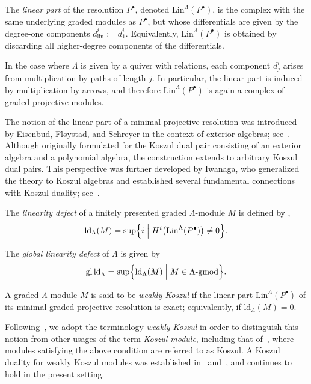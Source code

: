\documentclass[11pt]{article}
\theoremstyle{definition}
\theoremstyle{remark}
\begin{document}
\medskip

The \emph{linear part} of the resolution \(P^{\bullet}\), denoted \(\mathrm{Lin}^{\Lambda}(P^{\bullet})\), is the complex with the same underlying graded modules as \(P^{\bullet}\), but whose differentials are given by the degree-one components
\( 
d^{i}_{\mathrm{lin}} := d^{i}_{1}.
\)
Equivalently, \(\mathrm{Lin}^{\Lambda}(P^{\bullet})\) is obtained by discarding all higher-degree components of the differentials.

In the case where \(\Lambda\) is given by a quiver with relations, each component \(d^{i}_{j}\) arises from multiplication by paths of length \(j\). In particular, the linear part is induced by multiplication by arrows, and therefore \(\mathrm{Lin}^{\Lambda}(P^{\bullet})\) is again a complex of graded projective modules.

The notion of the linear part of a minimal projective resolution was introduced by Eisenbud, Fl{\o}ystad, and Schreyer in the context of exterior algebras; see~\cite{11}. Although originally formulated for the Koszul dual pair consisting of an exterior algebra and a polynomial algebra, the construction extends to arbitrary Koszul dual pairs. This perspective was further developed by Iwanaga, who generalized the theory to Koszul algebras and established several fundamental connections with Koszul duality; see~\cite{26}.

\medskip

The \emph{linearity defect} of a finitely presented graded \(\Lambda\)-module \(M\) is defined by
,
\[
\mathrm{ld}_{\Lambda}(M)
=
\sup\Bigl\{
i 
\;\Big|\;
H^{i}\bigl(\mathrm{Lin}^{\Lambda}(P^{\bullet})\bigr)\neq 0
\Bigr\}.
\]

\medskip

The \emph{global linearity defect} of \(\Lambda\) is given by
\[
\mathrm{gl\,ld}_{\Lambda}
=
\sup\Bigl\{
\mathrm{ld}_{\Lambda}(M)
\;\Big|\;
M \in \Lambda\textup{-gmod}
\Bigr\}.
\]

\medskip

A graded \(\Lambda\)-module \(M\) is said to be \emph{weakly Koszul} if the linear part \(\mathrm{Lin}^{\Lambda}(P^{\bullet})\) of its minimal graded projective resolution is exact; equivalently, if \(\mathrm{ld}_{\Lambda}(M)=0\).

\medskip

Following~\cite{19,26}, we adopt the terminology \emph{weakly Koszul} in order to distinguish this notion from other usages of the term \emph{Koszul module}, including that of~\cite{14}, where modules satisfying the above condition are referred to as Koszul. A Koszul duality for weakly Koszul modules was established in~\cite[Theorem~3.1]{16} and~\cite[Theorem~4.4]{26}, and continues to hold in the present setting.
\medskip
\end{document}
